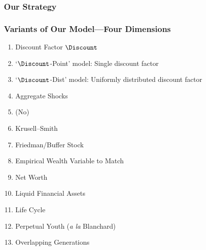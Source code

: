 \documentclass{beamer}
\newcommand{\jemph}[1]{{\color{jirkasred}#1}}
\begin{document}
\subsubsection{Our Strategy}



\begin{frame}
\frametitle{{Variants of Our Model---{Four Dimensions}}}

\begin{block}{}\footnotesize
\begin{enumerate}
\item \jemph{Discount Factor $\Discount$}
\bi \scriptsize
\item \jemph{`$\Discount$-Point' model:} Single discount factor
\item \jemph{`$\Discount$-Dist' model:} Uniformly distributed discount factor
\ei
\item \jemph{Aggregate Shocks}
\bi \scriptsize
\item (No)
\item Krusell--Smith
\item Friedman/Buffer Stock
\ei
\item \jemph{Empirical Wealth Variable to Match}
\bi \scriptsize
\item Net Worth
\item Liquid Financial Assets
\ei
\item \jemph{Life Cycle}
\bi \scriptsize
\item Perpetual Youth ({\it a la} Blanchard)
\item Overlapping Generations
\ei
\end{enumerate}
\end{block}

\end{frame}
\end{document}
